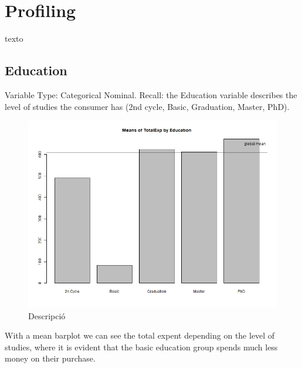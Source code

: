 \raggedright
\section{Profiling}

texto
\newline

\subsection{Education}
Variable Type: Categorical Nominal.\newline
Recall: the Education variable describes the level of studies the consumer has (2nd cycle, Basic, Graduation, Master, PhD).

\begin{figure}[H]
    \centering
    \includegraphics[width=0.8\linewidth]{Imatges/mean_barplot_TotalExp.png}
    \caption{Descripció}
    \label{fig:scree_plot}
\end{figure}
\newline
With a mean barplot we can see the total expent depending on the level of studies, where it is evident that the basic education group spends much less money on their purchase.

